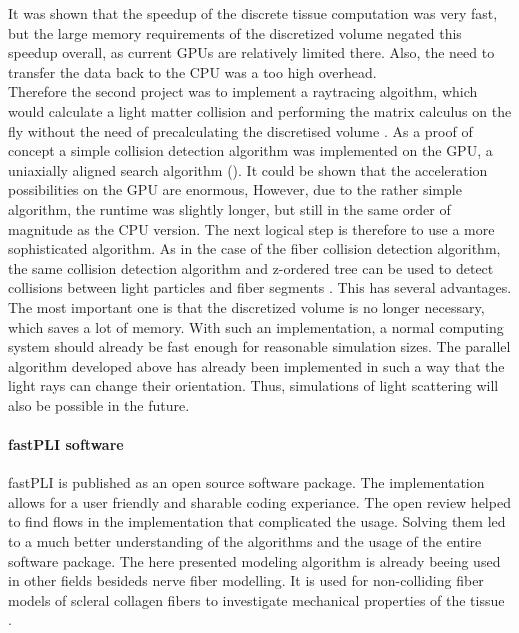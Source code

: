 It was shown that the speedup of the discrete tissue computation was very fast, but the large memory requirements of the discretized volume negated this speedup overall, as current \acp{GPU} are relatively limited there.
Also, the need to transfer the data back to the \ac{CPU} was a too high overhead.\\
Therefore the second project was to implement a raytracing algoithm, which would calculate a light matter collision and performing the matrix calculus on the fly without the need of precalculating the discretised volume \cite{Kobusch:887783}.
As a proof of concept a simple collision detection algorithm was implemented on the \ac{GPU}, a uniaxially aligned search algorithm (\cite{Karras2012}).
It could be shown that the acceleration possibilities on the \ac{GPU} are enormous,
However, due to the rather simple algorithm, the runtime was slightly longer, but still in the same order of magnitude as the \ac{CPU} version.
The next logical step is therefore to use a more sophisticated algorithm.
As in the case of the fiber collision detection algorithm, the same collision detection algorithm and z-ordered tree can be used to detect collisions between light particles and fiber segments \cite{Karras2012}.
This has several advantages.
The most important one is that the discretized volume is no longer necessary, which saves a lot of memory.
With such an implementation, a normal computing system should already be fast enough for reasonable simulation sizes.
The parallel algorithm developed above has already been implemented in such a way that the light rays can change their orientation.
Thus, simulations of light scattering will also be possible in the future.
% 
% 
% 
\paragraph{\acs{fastPLI} software}%
\ac{fastPLI} is published as an open source software package.
The \python{} implementation allows for a user friendly and sharable coding experiance.
The open review helped to find flows in the implementation that complicated the usage.
Solving them led to a much better understanding of the algorithms and the usage of the entire software package.
The here presented modeling algorithm is already beeing used in other fields besideds nerve fiber modelling.
It is used for non-colliding fiber models of scleral collagen fibers to investigate mechanical properties of the tissue \cite{Ji2021}.